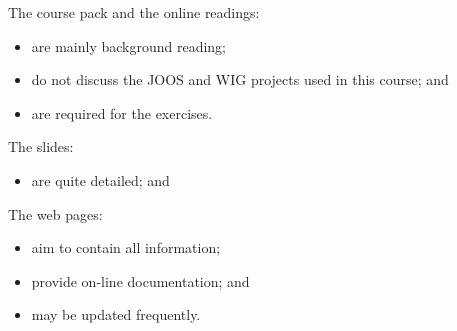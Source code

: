 \begin{slide*}
The course pack and the online readings:
\begin{itemize}
\item are mainly background reading;
\item do not discuss the JOOS and WIG projects used in this course; and
\item are required for the exercises.
\end{itemize}
The slides:
\begin{itemize}
\item are quite detailed; and
\end{itemize}
The web pages:
\begin{itemize}
\item aim to contain all information;
\item provide on-line documentation; and
\item may be updated frequently.
\end{itemize}
\vfil
\end{slide*}



